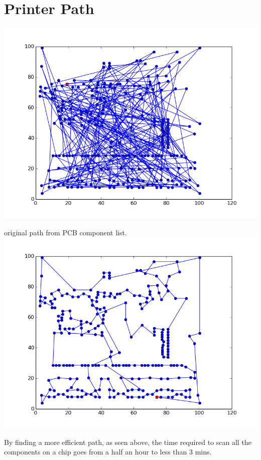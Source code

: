 \documentclass[12pt]{article}
\begin{document}
\section{Printer Path}
\includegraphics[scale=0.8]{images/Path/original_path.png}

original path from PCB component list. 
\newpage
\includegraphics[scale=0.8]{images/Path/best_found_path.png}

By finding a more efficient path, as seen above, the time required to scan all the components on a chip goes from a half an hour to less than 3 mins. 
\end{document}
